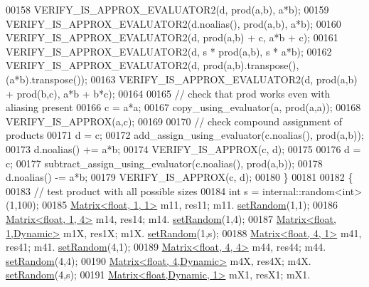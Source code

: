 \begin{DoxyCode}
00158     VERIFY\_IS\_APPROX\_EVALUATOR2(d, prod(a,b), a*b);
00159     VERIFY\_IS\_APPROX\_EVALUATOR2(d.noalias(), prod(a,b), a*b);
00160     VERIFY\_IS\_APPROX\_EVALUATOR2(d, prod(a,b) + c, a*b + c);
00161     VERIFY\_IS\_APPROX\_EVALUATOR2(d, s * prod(a,b), s * a*b);
00162     VERIFY\_IS\_APPROX\_EVALUATOR2(d, prod(a,b).transpose(), (a*b).transpose());
00163     VERIFY\_IS\_APPROX\_EVALUATOR2(d, prod(a,b) + prod(b,c), a*b + b*c);
00164 
00165     \textcolor{comment}{// check that prod works even with aliasing present}
00166     c = a*a;
00167     copy\_using\_evaluator(a, prod(a,a));
00168     VERIFY\_IS\_APPROX(a,c);
00169 
00170     \textcolor{comment}{// check compound assignment of products}
00171     d = c;
00172     add\_assign\_using\_evaluator(c.noalias(), prod(a,b));
00173     d.noalias() += a*b;
00174     VERIFY\_IS\_APPROX(c, d);
00175 
00176     d = c;
00177     subtract\_assign\_using\_evaluator(c.noalias(), prod(a,b));
00178     d.noalias() -= a*b;
00179     VERIFY\_IS\_APPROX(c, d);
00180   \}
00181 
00182   \{
00183     \textcolor{comment}{// test product with all possible sizes}
00184     \textcolor{keywordtype}{int} s = internal::random<int>(1,100);
00185     \hyperlink{group___core___module_class_eigen_1_1_matrix}{Matrix<float,      1,      1>} m11, res11;  m11.
      \hyperlink{class_eigen_1_1_plain_object_base_af0e576a0e1aefc9ee346de44cc352ba3}{setRandom}(1,1);
00186     \hyperlink{group___core___module_class_eigen_1_1_matrix}{Matrix<float,      1,      4>} m14, res14;  m14.
      \hyperlink{class_eigen_1_1_plain_object_base_af0e576a0e1aefc9ee346de44cc352ba3}{setRandom}(1,4);
00187     \hyperlink{group___core___module_class_eigen_1_1_matrix}{Matrix<float,      1,Dynamic>} m1X, res1X;  m1X.
      \hyperlink{class_eigen_1_1_plain_object_base_af0e576a0e1aefc9ee346de44cc352ba3}{setRandom}(1,s);
00188     \hyperlink{group___core___module_class_eigen_1_1_matrix}{Matrix<float,      4,      1>} m41, res41;  m41.
      \hyperlink{class_eigen_1_1_plain_object_base_af0e576a0e1aefc9ee346de44cc352ba3}{setRandom}(4,1);
00189     \hyperlink{group___core___module_class_eigen_1_1_matrix}{Matrix<float,      4,      4>} m44, res44;  m44.
      \hyperlink{class_eigen_1_1_plain_object_base_af0e576a0e1aefc9ee346de44cc352ba3}{setRandom}(4,4);
00190     \hyperlink{group___core___module_class_eigen_1_1_matrix}{Matrix<float,      4,Dynamic>} m4X, res4X;  m4X.
      \hyperlink{class_eigen_1_1_plain_object_base_af0e576a0e1aefc9ee346de44cc352ba3}{setRandom}(4,s);
00191     \hyperlink{group___core___module_class_eigen_1_1_matrix}{Matrix<float,Dynamic,      1>} mX1, resX1;  mX1.

\end{DoxyCode}
